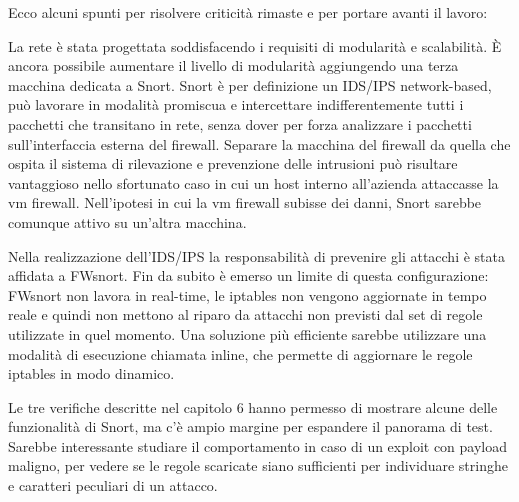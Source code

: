 Ecco alcuni spunti per risolvere criticità rimaste e per portare avanti il lavoro:

La rete è stata progettata soddisfacendo i requisiti di modularità e scalabilità. È ancora possibile aumentare il livello di modularità aggiungendo una terza macchina dedicata a Snort. Snort è per definizione un IDS/IPS network-based, può lavorare in modalità promiscua e intercettare indifferentemente tutti i pacchetti che transitano in rete, senza dover per forza analizzare i pacchetti sull'interfaccia esterna del firewall. Separare la macchina del firewall da quella che ospita il sistema di rilevazione e prevenzione delle intrusioni può risultare vantaggioso nello sfortunato caso in cui un host interno all'azienda attaccasse la vm firewall. Nell'ipotesi in cui la vm firewall subisse dei danni, Snort sarebbe comunque attivo su un'altra macchina.

Nella realizzazione dell'IDS/IPS la responsabilità di prevenire gli attacchi è stata affidata a FWsnort. Fin da subito è emerso un limite di questa configurazione: FWsnort non lavora in real-time, le iptables non vengono aggiornate in tempo reale e quindi non mettono al riparo da attacchi non previsti dal set di regole utilizzate in quel momento. Una soluzione più efficiente sarebbe utilizzare una modalità di esecuzione chiamata inline, che permette di aggiornare le regole iptables in modo dinamico.

Le tre verifiche descritte nel capitolo 6 hanno permesso di mostrare alcune delle funzionalità di Snort, ma c'è ampio margine per espandere il panorama di test. Sarebbe interessante studiare il comportamento in caso di un exploit con payload maligno, per vedere se le regole scaricate siano sufficienti per individuare stringhe e caratteri peculiari di un attacco.

